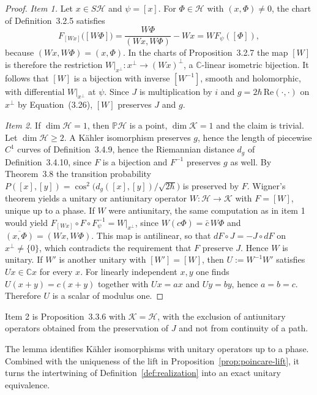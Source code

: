 \begin{proof}
	\emph{Item 1.} Let $x\in S\mathcal{H}$ and $\psi=[x]$. For $\Phi\in\mathcal{H}$ with $(x,\Phi)\neq0$, the chart of Definition~3.2.5 satisfies
	\begin{equation*}
		F_{[Wx]}\big([W\Phi]\big)=\frac{W\Phi}{(Wx,W\Phi)}-Wx=W F_\psi([\Phi]),
	\end{equation*}
	because $(Wx,W\Phi)=(x,\Phi)$. In the charts of Proposition~3.2.7 the map $[W]$ is therefore the restriction $W|_{x^\perp}:x^\perp\to(Wx)^\perp$, a $\mathbb{C}$-linear isometric bijection. It follows that $[W]$ is a bijection with inverse $[W^{-1}]$, smooth and holomorphic, with differential $W|_{x^\perp}$ at $\psi$. Since $J$ is multiplication by $i$ and $g=2\hbar\,\mathrm{Re}(\cdot,\cdot)$ on $x^\perp$ by Equation~(3.26), $[W]$ preserves $J$ and $g$.
	
	\emph{Item 2.} If $\dim\mathcal{H}=1$, then $\mathbb{P}\mathcal{H}$ is a point, $\dim\mathcal{K}=1$ and the claim is trivial. Let $\dim\mathcal{H}\geq2$. A Kähler isomorphism preserves $g$, hence the length of piecewise $C^1$ curves of Definition~3.4.9, hence the Riemannian distance $d_g$ of Definition~3.4.10, since $F$ is a bijection and $F^{-1}$ preserves $g$ as well. By Theorem~3.8 the transition probability $P([x],[y])=\cos^2\!\big(d_g([x],[y])/\sqrt{2\hbar}\big)$ is preserved by $F$. Wigner's theorem \cite[TODO-location]{TODO-Mor18} yields a unitary or antiunitary operator $W:\mathcal{H}\to\mathcal{K}$ with $F=[W]$, unique up to a phase. If $W$ were antiunitary, the same computation as in item 1 would yield $F_{[Wx]}\circ F\circ F_\psi^{-1}=W|_{x^\perp}$, since $W(c\Phi)=\bar{c}\,W\Phi$ and $\overline{(x,\Phi)}=(Wx,W\Phi)$. This map is antilinear, so that $dF\circ J=-J\circ dF$ on $x^\perp\neq\{0\}$, which contradicts the requirement that $F$ preserve $J$. Hence $W$ is unitary. If $W'$ is another unitary with $[W']=[W]$, then $U:=W^{-1}W'$ satisfies $Ux\in\mathbb{C}x$ for every $x$. For linearly independent $x,y$ one finds $U(x+y)=c(x+y)$ together with $Ux=ax$ and $Uy=by$, hence $a=b=c$. Therefore $U$ is a scalar of modulus one.
\end{proof}

\noindent Item 2 is Proposition~3.3.6 with $\mathcal{K}=\mathcal{H}$, with the exclusion of antiunitary operators obtained from the preservation of $J$ and not from continuity of a path.

The lemma identifies Kähler isomorphisms with unitary operators up to a phase. Combined with the uniqueness of the lift in Proposition~\ref{prop:poincare-lift}, it turns the intertwining of Definition~\ref{def:realization} into an exact unitary equivalence.

